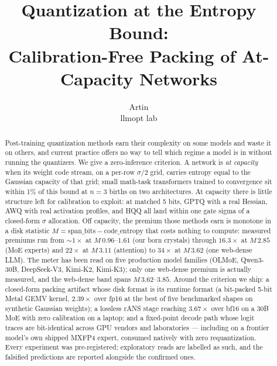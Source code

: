 \documentclass[11pt]{article}
\title{Quantization at the Entropy Bound:\\
Calibration-Free Packing of At-Capacity Networks}
\author{Artin \\ \small llmopt lab}
\date{}
\begin{document}
\maketitle

\begin{abstract}
Post-training quantization methods earn their complexity on some models and
waste it on others, and current practice offers no way to tell which regime a
model is in without running the quantizers. We give a zero-inference criterion.
A network is \emph{at capacity} when its weight code stream, on a per-row
$\sigma/2$ grid, carries entropy equal to the Gaussian capacity of that grid;
small math-task transformers trained to convergence sit within 1\% of this bound
at $n{=}3$ births on two architectures. At capacity there is little structure
left for calibration to exploit: at matched 5 bits, GPTQ with a real Hessian,
AWQ with real activation profiles, and HQQ all land within one gate sigma of a
closed-form $\sigma$ allocation. %
Off capacity, the premium those methods earn is monotone in a disk statistic
$M = \text{span\_bits} - \text{code\_entropy}$ that costs nothing to compute:
measured premiums run from $\sim 1\times$ at $M\,0.96$--$1.61$ (our born
crystals) %
through $16.3\times$ at $M\,2.85$ (MoE experts) and $22\times$ at $M\,3.11$
(attention) %
to $34\times$ at $M\,3.62$ (one web-dense LLM). %
The meter has been read on five production model families
(OLMoE, Qwen3-30B, DeepSeek-V3, Kimi-K2, Kimi-K3); only one web-dense premium
is actually measured, and the web-dense band spans $M\,3.62$--$3.85$.
Around the criterion we ship: a closed-form packing artifact whose disk format
is its runtime format (a bit-packed 5-bit Metal GEMV kernel, $2.39\times$ over
fp16 at the best of five benchmarked shapes on synthetic Gaussian weights);
a lossless rANS stage reaching $3.67\times$ over bf16 on a 30B MoE with zero
calibration on a laptop; %
and a fixed-point decode path whose logit traces are bit-identical across GPU
vendors and laboratories %
--- including on a frontier model's own shipped MXFP4 expert, consumed natively
with zero requantization. %
Every experiment was pre-registered; exploratory reads are labelled as such,
and the falsified predictions are reported alongside the confirmed ones.
\end{abstract}
\end{document}
